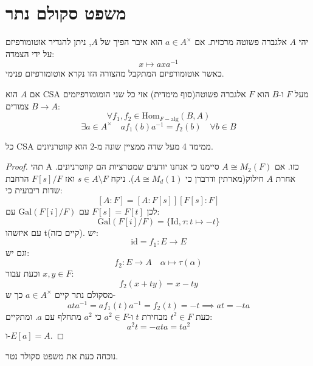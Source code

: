 \documentclass{tstextbook}
\begin{document}
\section{משפט סקולם נתר}

\begin{definition}
יהי \(A\) אלגברה פשוטה מרכזית. אם \(a \in A^{\times}\) הוא איבר הפיך של \(A\), ניתן להגדיר אוטומורפיזם על ידי הצמדה:
$$x\mapsto ax a ^{-1}$$
כאשר אוטומורפיזם המתקבל מהצורה הזו נקרא אוטומורפיזם פנימי.

\end{definition}
\begin{theorem}
אם \(A\) הוא CSA מעל \(F\) ו-\(B\) הוא \(F\) אלגברה פשוטה(סוף מימדית) אזי כל שני הומומורפיזמים \(B\to A\) צמודים:
$$\forall f_{1},f_{2} \in \mathrm{Hom}_{F-\text{alg}}(B,A)$$$$\exists a \in A^{\times }\quad af_{1}(b)a^{-1} =f_{2}(b)\quad \forall b \in B$$

\end{theorem}
\begin{corollary}
כל CSA ממימד 4 מעל שדה ממציין שונה מ-2 הוא קווטרניונים.

\end{corollary}
\begin{proof}
תהי A כזו. אם \(A\cong M_{2}(F)\) סיימנו כי אנחנו יודעים שמטרציות הם קווטרניונים. אחרת \(A\) חילוק(מארתין ודרברן כי \(A\cong M_{d}(1)\)). ניקח \(s \in A \setminus F\) ואז \(F[s] / F\) הרחבת שדות ריבועית כי:
$$[A:F]=[A:F[s]][F[s]:F]$$
לכן \(F[s]=F[t]\) עם \(\mathrm{Gal}(F[i] / F)\) עם:
$$\mathrm{Gal}(F[i] / F)= \{ \mathrm{Id}, \tau: t\mapsto-t \}$$
עם איזשהו t(קיים כזה). יש:
$$\text{id}=f_{1}:E\to E$$
וגם יש:
$$f_{2}:E\to A\quad \alpha \mapsto \tau(\alpha)$$
וכעת עבור \(x,y \in F\):
$$f_{2}(x+ty)=x-ty$$
מסקולם נתר קיים \(a \in A^{\times}\) כך ש-
$$a t a ^{-1} = a f_{1}(t)a ^{-1}  = f_{2}(t)=-t\implies at = -ta$$
כעת \(t^{2}\in F\) מבחירת \(t\) ו-\(a^{2} \in F\) כי \(a^{2}\) מתחלף עם \(a\).  ומתקיים:
$$a^{2}t=-ata=ta^{2}$$
ו-\(E[a]=A\).

\end{proof}
נוכחה כעת את משפט סקולר נטר.
\end{document}
